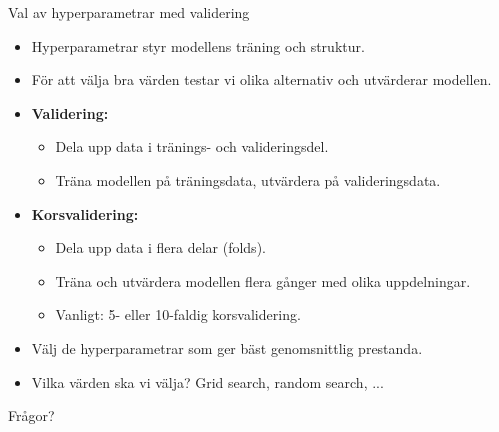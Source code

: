 \documentclass[10pt,english]{beamer}
\begin{document}
\begin{frame}{Val av hyperparametrar med validering}
  \begin{itemize}
    \item Hyperparametrar styr modellens träning och struktur.
    \item För att välja bra värden testar vi olika alternativ och utvärderar modellen.
    \item \textbf{Validering:}
    \begin{itemize}
      \item Dela upp data i tränings- och valideringsdel.
      \item Träna modellen på träningsdata, utvärdera på valideringsdata.
    \end{itemize}
    \item \textbf{Korsvalidering:}
    \begin{itemize}
      \item Dela upp data i flera delar (folds).
      \item Träna och utvärdera modellen flera gånger med olika uppdelningar.
      \item Vanligt: 5- eller 10-faldig korsvalidering.
    \end{itemize}
    \item Välj de hyperparametrar som ger bäst genomsnittlig prestanda.
    \item Vilka värden ska vi välja? Grid search, random search, ...
  \end{itemize}
\end{frame}

\begin{frame}{Frågor?}
    
\end{frame}
\end{document}
